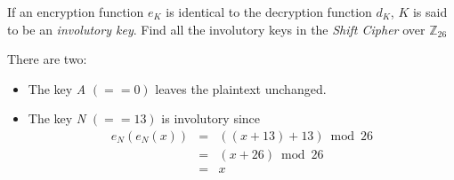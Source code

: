 \begin{statement}{1.6}
  If an encryption function $e_K$ is identical to the decryption function $d_K$, $K$ is said to be an \textit{involutory key}. Find all the involutory keys in the \textsl{Shift Cipher} over $\mathbb{Z}_{26}$
\end{statement}

There are two:
\begin{itemize}
\item The key \textsl{A} $(== 0)$ leaves the plaintext unchanged.
\item The key \textsl{N} $(== 13)$ is involutory since
  \begin{eqnarray*}
    e_{N}(e_{N}(x)) &=& ((x + 13) + 13) \bmod 26 \\
    &=& (x + 26) \bmod 26 \\
    &=& x
  \end{eqnarray*}
\end{itemize}


